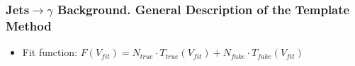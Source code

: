 \begin{frame}\frametitle{Jets$\rightarrow \gamma$ Background. General Description of the Template Method}
  \scriptsize
  \begin{itemize}
    \item Fit function: $F(V_{fit})=N_{true} \cdot T_{true}(V_{fit}) + N_{fake} \cdot T_{fake}(V_{fit})$
  \end{itemize}
\end{frame}

